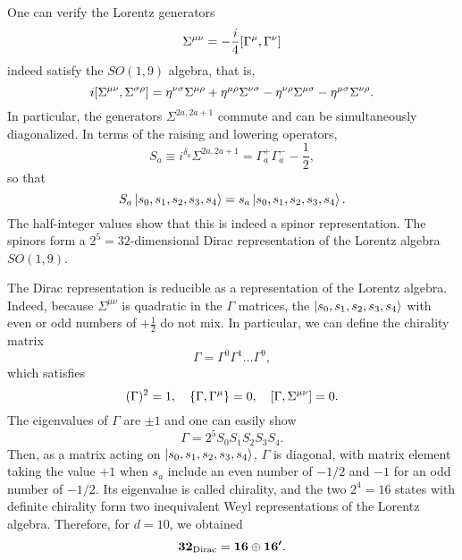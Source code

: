 \begin{mdframed}
One can verify the Lorentz generators
\begin{equation}
    \Sigma^{\mu\nu} = -\frac{i}{4} \comm{\Gamma^\mu}{\Gamma^\nu}
\end{equation}
indeed satisfy the $SO(1,9)$ algebra, that is,
\begin{equation}
    i \comm{\Sigma^{\mu\nu}}{\Sigma^{\sigma\rho}} = \eta^{\nu\sigma} \Sigma^{\mu\rho} + \eta^{\mu\rho}\Sigma^{\nu\sigma} - \eta^{\nu\rho}\Sigma^{\mu\sigma} - \eta^{\mu\sigma}\Sigma^{\nu\rho}.
\end{equation}
In particular, the generators $\Sigma^{2a,2a+1}$ commute and can be simultaneously diagonalized. In terms of the raising and lowering operators,
\begin{equation}\label{eq:md-spin-def}
    S_a \equiv i^{\delta_a} \Sigma^{2a,2a+1} = \Gamma^+_a \Gamma^-_a - \frac{1}{2},
\end{equation}
so that
\begin{equation}
    S_a \ket{s_0,s_1,s_2,s_3,s_4} = s_a \ket{s_0,s_1,s_2,s_3,s_4}.
\end{equation}
The half-integer values show that this is indeed a spinor representation. The spinors form a $2^5 = 32$-dimensional Dirac representation of the Lorentz algebra $SO(1,9)$.

The Dirac representation is reducible as a representation of the Lorentz algebra. Indeed, because $\Sigma^{\mu\nu}$ is quadratic in the $\Gamma$ matrices, the $\ket{s_0,s_1,s_2,s_3,s_4}$ with even or odd numbers of $+\frac{1}{2}$ do not mix. In particular, we can define the chirality matrix 
\begin{equation}
    \Gamma = \Gamma^0 \Gamma^1 \dots \Gamma^9,
\end{equation}
which satisfies
\begin{equation}
    (\Gamma)^2 = 1, \quad \{ \Gamma,\Gamma^\mu \} =0, \quad \comm{\Gamma}{\Sigma^{\mu\nu}} = 0.
\end{equation}
The eigenvalues of $\Gamma$ are $\pm 1$ and one can easily show
\begin{equation}\label{eq:md-chirality}
    \Gamma = 2^5 S_0 S_1 S_2 S_3 S_4 .
\end{equation}
Then, as a matrix acting on $\ket{s_0,s_1,s_2,s_3,s_4}$, $\Gamma$ is diagonal, with matrix element taking the value $+1$ when $s_a$ include an even number of $-1/2$ and $-1$ for an odd number of $-1/2$. Its eigenvalue is called chirality, and the two $2^4 = 16$ states with definite chirality form two inequivalent Weyl representations of the Lorentz algebra. Therefore, for $d=10$, we obtained
\begin{equation}\label{eq:clifford-branch}
    \boldsymbol{32}_\textup{Dirac} = \boldsymbol{16} \oplus \boldsymbol{16'} .
\end{equation}


\end{mdframed}
